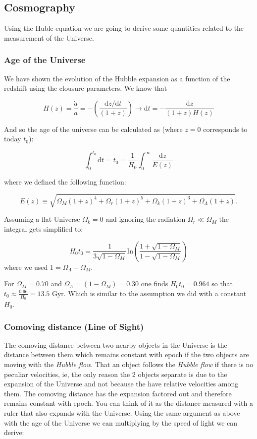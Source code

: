 \documentclass[
  letterpaper,
  DIV=11,
  numbers=noendperiod]{scrreprt}
\begin{document}
\subsection{Cosmography}\label{cosmography}

Using the Huble equation we are going to derive some quantities related
to the measurement of the Universe.

\subsubsection{Age of the Universe}\label{age-of-the-universe}

We have shown the evolution of the Hubble expansion as a function of the
redshift using the clousure parameters. We know that

\[H(z) = \frac{\dot a}{a} = -\left(\frac{\mathrm{ d}z/\mathrm{ d}t}{(1+z)}\right) \rightarrow \mathrm{ d}t = -\frac{\mathrm{ d}z}{(1+z)H(z)}\]

And so the age of the universe can be calculated as (where \(z=0\)
corresponds to today \(t_0\)):

\[\int_{0}^{t_0} \mathrm{ d} t = t_0 = \frac{1}{H_0} \int^\infty_0 \frac{\mathrm{ d}z}{E(z)}\]

where we defined the following function:

\[E(z)\equiv \sqrt{\Omega_M(1+z)^4 + \Omega_r(1+z)^5 + \Omega_k(1+z)^3 +\Omega_\Lambda(1+z)}.\]

Assuming a flat Universe \(\Omega_k =0\) and ignoring the radiation
\(\Omega_r \ll \Omega_M\) the integral gets simplified to:

\[H_0 t_0 = \frac{1}{3\sqrt{1 - \Omega_M}}\mathrm{ In}\left(\frac{1+\sqrt{1 - \Omega_M}}{1 - \sqrt{1- \Omega_M}}\right)\]
where we used \(1 = \Omega_\Lambda + \Omega_M.\)

For \(\Omega_M = 0.70\) and \(\Omega_\Lambda = (1 - \Omega_M) = 0.30\)
one finds \(H_0 t_0 = 0.964\) so that
\(t_0 \approx \frac{0.96}{H_0} = 13.5\) Gyr. Which is similar to the
assumption we did with a constant \(H_0\).

\subsubsection{Comoving distance (Line of
Sight)}\label{comoving-distance-line-of-sight}

The comoving distance between two nearby objects in the Universe is the
distance between them which remains constant with epoch if the two
objects are moving with the \emph{Hubble flow}. That an object follows
the \emph{Hubble flow} if there is no peculiar velocities, ie, the only
reason the 2 objects separate is due to the expansion of the Universe
and not because the have relative velocities among them. The comoving
distance has the expansion factored out and therefore remains constant
with epoch. You can think of it as the distance measured with a ruler
that also expands with the Universe. Using the same argument as above
with the age of the Universe we can multiplying by the speed of light we
can derive:
\end{document}
